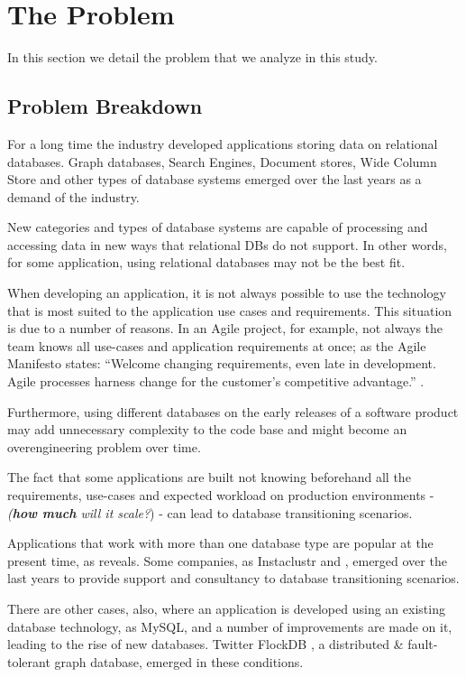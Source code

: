 \chapter{The Problem}\label{theProblemChap}
In this section we detail the problem that we analyze in this study.

\section{Problem Breakdown}

For a long time the industry developed applications storing data on relational databases. Graph databases, Search Engines, Document stores, Wide Column Store and other types of database systems emerged over the last years as a demand of the industry. 

New categories and types of database systems are capable of processing and accessing data in new ways that relational DBs do not support. In other words, for some application, using relational databases may not be the best fit. 

When developing an application, it is not always possible to use the technology that is most suited to the application use cases and requirements. This situation is due to a number of reasons. In an Agile project, for example, not always the team knows all use-cases and application requirements at once; as the Agile Manifesto states: ``Welcome changing requirements, even late in 
development. Agile processes harness change for 
the customer's competitive advantage.'' \cite{fowler2001agile}. 

Furthermore, using different databases on the early releases of a software product may add unnecessary complexity to the code base and might become an overengineering problem over time. 

The fact that some applications are built not knowing beforehand all the requirements, use-cases and expected workload on production environments - \textit{(\textbf{how much} will it scale?}) - can lead to database transitioning scenarios.

Applications that work with more than one database type are popular at the present time, as \cite{sadalage2012nosql} reveals. Some companies, as Instaclustr \cite{instaclustr} and \cite{elastic}, emerged over the last years to provide support and consultancy to database transitioning scenarios.

There are other cases, also, where an application is developed using an existing database technology, as MySQL, and a number of improvements are made on it, leading to the rise of new databases. Twitter FlockDB \cite{flockdb}, a distributed \& fault-tolerant graph database, emerged in these conditions. 


